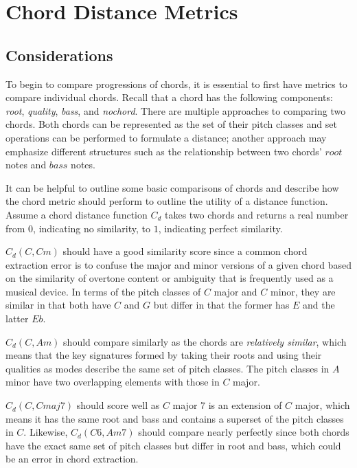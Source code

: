 \section{Chord Distance Metrics}

\subsection{Considerations}

To begin to compare progressions of chords, it is essential to first have metrics to compare individual chords. Recall that a chord has the following components: \textit{root}, \textit{quality}, \textit{bass}, and \textit{nochord}. There are multiple approaches to comparing two chords. Both chords can be represented as the set of their pitch classes and set operations can be performed to formulate a distance; another approach may emphasize different structures such as the relationship between two chords' $root$ notes and $bass$ notes.

It can be helpful to outline some basic comparisons of chords and describe how the chord metric should perform to outline the utility of a distance function. Assume a chord distance function $C_d$ takes two chords and returns a real number from $0$, indicating no similarity, to $1$, indicating perfect similarity.

$C_d(C,Cm)$ should have a good similarity score since a common chord extraction error is to confuse the major and minor versions of a given chord based on the similarity of overtone content or ambiguity that is frequently used as a musical device. In terms of the pitch classes of $C$ major and $C$ minor, they are similar in that both have $C$ and $G$ but differ in that the former has $E$ and the latter $Eb$.

$C_d(C,Am)$ should compare similarly as the chords are \textit{relatively similar}, which means that the key signatures formed by taking their roots and using their qualities as modes describe the same set of pitch classes. The pitch classes in $A$ minor have two overlapping elements with those in $C$ major.

$C_d(C,Cmaj7)$ should score well as $C$ major 7 is an extension of $C$ major, which means it has the same root and bass and contains a superset of the pitch classes in $C$. Likewise, $C_d(C6, Am7)$ should compare nearly perfectly since both chords have the exact same set of pitch classes but differ in root and bass, which could be an error in chord extraction.

